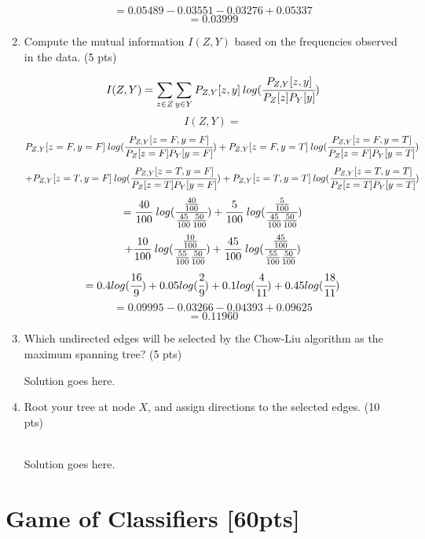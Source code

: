 \documentclass[a4paper]{article}
\theoremstyle{definition}
\newenvironment{soln}{
    \leavevmode\color{blue}\ignorespaces
}{}
\begin{document}
\begin{enumerate}
\begin{soln}
        \[  = 0.05489 - 0.03551 - 0.03276 + 0.05337\]
        \[  = 0.03999 \]
    \end{soln}
	\item Compute the mutual information $I(Z, Y)$ based on the frequencies observed in the data. (5 pts)
	\begin{soln}
        \[  I(Z, Y) = \sum_{z \in Z} \sum_{y \in Y} P_{Z,Y}[z, y]\:log(\cfrac{P_{Z,Y}[z, y]}{P_Z[z]P_Y[y]})  \]
        \[  I(Z, Y) = \]
        \[ P_{Z,Y}[z=F, y=F]\:log(\cfrac{P_{Z,Y}[z=F, y=F]}{P_Z[z=F]P_Y[y=F]}) + P_{Z,Y}[z=F, y=T]\:log(\cfrac{P_{Z,Y}[z=F, y=T]}{P_Z[z=F]P_Y[y=T]})\]
        \[  + P_{Z,Y}[z=T, y=F]\:log(\cfrac{P_{Z,Y}[z=T, y=F]}{P_Z[z=T]P_Y[y=F]}) + P_{Z,Y}[z=T, y=T]\:log(\cfrac{P_{Z,Y}[z=T, y=T]}{P_Z[z=T]P_Y[y=T]})\]
        \[  = \frac{40}{100}\:log(\cfrac{\frac{40}{100}}{\frac{45}{100}\frac{50}{100}}) + \frac{5}{100}\:log(\cfrac{\frac{5}{100}}{\frac{45}{100}\frac{50}{100}})\]
        \[  + \frac{10}{100}\:log(\cfrac{\frac{10}{100}}{\frac{55}{100}\frac{50}{100}}) + \frac{45}{100}\:log(\cfrac{\frac{45}{100}}{\frac{55}{100}\frac{50}{100}})\]
        \[  = 0.4log(\cfrac{16}{9}) + 0.05log(\cfrac{2}{9}) + 0.1log(\cfrac{4}{11}) + 0.45log(\cfrac{18}{11}) \]
        \[  = 0.09995 - 0.03266 - 0.04393 +  0.09625\]
        \[  = 0.11960 \]
    \end{soln}
	\item Which undirected edges will be selected by the Chow-Liu algorithm as the maximum spanning tree? (5 pts)
	\begin{soln}
        Solution goes here.
    \end{soln}
	\item Root your tree at node $X$, and assign directions to the selected edges. (10 pts)
	\begin{soln}
        \\Solution goes here.
    \end{soln}
\end{enumerate}

\section{Game of Classifiers [60pts]}
\end{document}
